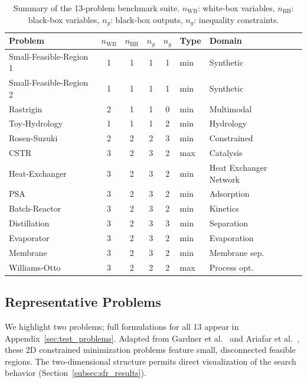 \documentclass[12pt,a4paper]{article}%
\theoremstyle{plain}%
\theoremstyle{remark}%
\theoremstyle{definition}%
\def\WB{\mathrm{WB}}
\def\BB{\mathrm{BB}}
\begin{document}
\begin{table}[htbp]
\centering
\caption{Summary of the 13-problem benchmark suite. $n_{\WB}$: white-box variables, $n_{\BB}$: black-box variables, $n_y$: black-box outputs, $n_g$: inequality constraints.}
\label{tab:benchmark_summary}
\begin{tabular}{@{}lccccll@{}}
\toprule
\textbf{Problem} & $n_{\WB}$ & $n_{\BB}$ & $n_y$ & $n_g$ & \textbf{Type} & \textbf{Domain} \\
\midrule
Small-Feasible-Region 1 & 1 & 1 & 1 & 1 & min & Synthetic \\
Small-Feasible-Region 2 & 1 & 1 & 1 & 1 & min & Synthetic \\
Rastrigin & 2 & 1 & 1 & 0 & min & Multimodal \\
Toy-Hydrology & 1 & 1 & 1 & 2 & min & Hydrology \\
Rosen-Suzuki & 2 & 2 & 2 & 3 & min & Constrained \\
\midrule
CSTR & 3 & 2 & 3 & 2 & max & Catalysis \\
Heat-Exchanger & 3 & 2 & 3 & 2 & min & Heat Exchanger Network \\
PSA & 3 & 2 & 3 & 2 & min & Adsorption \\
Batch-Reactor & 3 & 2 & 3 & 2 & min & Kinetics \\
Distillation & 3 & 2 & 3 & 3 & min & Separation \\
Evaporator & 3 & 2 & 3 & 2 & min & Evaporation \\
Membrane & 3 & 2 & 3 & 2 & min & Membrane sep.\ \\
Williams-Otto & 3 & 2 & 2 & 2 & max & Process opt.\ \\
\bottomrule
\end{tabular}
\end{table}



\subsection{Representative Problems}\label{subsec:representative_problems}

We highlight two problems; full formulations for all 13 appear in Appendix~\ref{sec:test_problems}.
Adapted from Gardner et al.~\cite{gardner2014} and Ariafar et al.~\cite{Ariafar2019}, these 2D constrained minimization problems feature small, disconnected feasible regions. The two-dimensional structure permits direct visualization of the search behavior (Section~\ref{subsec:sfr_results}).
\end{document}
